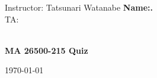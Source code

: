 \documentclass[11pt,letterpaper,addpoints]{exam}%
\begin{document}




\noindent Instructor: Tatsunari Watanabe
\hfill \textbf{Name:\underline{\phantom{My name way too long}}.}\\
\noindent TA: \href{mailto:\email}{\auth}
\\\\
\begin{center}
  {\Large \textbf{MA 26500-215 \quad Quiz \examnum}}

  \bigskip

  \today
\end{center}

\printanswers
\CorrectChoiceEmphasis{\color{Red!85!black}\bfseries}


\end{document}
